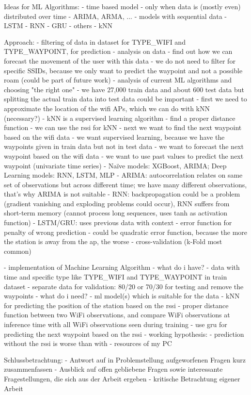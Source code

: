     Ideas for ML Algorithms:
        - time based model
            - only when data is (mostly even) distributed over time
            - ARIMA, ARMA, ...
        - models with sequential data
            - LSTM
            - RNN
            - GRU
        - others
            - kNN

Approach:
    - filtering of data in dataset for TYPE_WIFI and TYPE_WAYPOINT, for prediction
        - analysis on data
        - find out how we can forecast the movement of the user with this data
        - we do not need to filter for specific SSIDs, because we only want to predict the waypoint and not a possible roam (could be part of future work)
    - analysis of current ML algorithms and choosing "the right one"
        - we have 27,000 train data and about 600 test data but splitting the actual train data into test data could be important
        - first we need to approximate the location of the wifi APs, which we can do with kNN (necessary?)
            - kNN is a supervised learning algorithm
            - find a proper distance function
            - we can use the rssi for kNN
        - next we want to find the next waypoint based on the wifi data 
            - we want supervised learning, because we have the waypoints given in train data but not in test data
                - we want to forecast the next waypoint based on the wifi data
                    - we want to use past values to predict the next waypoint (univariate time series)
                    - Naïve models: XGBoost, ARIMA; Deep Learning models: RNN, LSTM, MLP
                    - ARIMA: autocorrelation relates on same set of observations but across different time; we have many different observations, that's why ARIMA is not suitable
                    - RNN: backpropagation could be a problem (gradient vanishing and exploding problems could occur), RNN suffers from short-term memory (cannot process long sequences, uses tanh as activation function)
                    - LSTM/GRU: uses previous data with context 
        - error function for penalty of wrong prediction
            - could be quadratic error function, because the more the station is away from the ap, the worse 
        - cross-validation (k-Fold most common)

    - implementation of Machine Learning Algorithm
        - what do i have?
            - data with time and specific type like TYPE_WIFI and TYPE_WAYPOINT in train dataset
            - separate data for validation: 80/20 or 70/30 for testing and remove the waypoints
        - what do i need?
            - ml model(s) which is suitable for the data
                - kNN for predicting the position of the station based on the rssi
                    - proper distance function between two WiFi observations, and compare WiFi observations at inference time with all WiFi observations seen during training
                -  use gru for predicting the next waypoint based on the rssi
                - working hypothesis:
                    - prediction without the rssi is worse than with
            - resources of my PC


Schlussbetrachtung:
    - Antwort auf in Problemstellung aufgeworfenen Fragen kurz zusammenfassen
    - Ausblick auf offen gebliebene Fragen sowie interessante Fragestellungen, die sich aus der Arbeit ergeben
    - kritische Betrachtung eigener Arbeit

